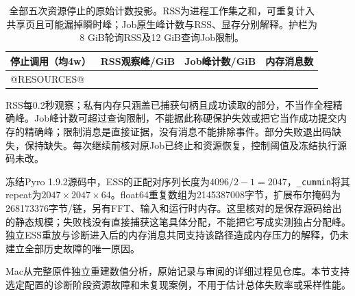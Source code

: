 \begin{table}[htbp]\centering\small
\begin{tabular}{lrrr}\toprule
停止调用（均4w） & RSS观察峰/GiB & Job峰计数/GiB & 内存消息数\\\midrule
@RESOURCES@
\bottomrule\end{tabular}
\caption{全部五次资源停止的原始计数投影。RSS为进程工作集之和，可重复计入共享页且可能漏掉瞬时峰；Job原生峰计数与RSS、显存分别解释。护栏为8 GiB轮询RSS及12 GiB查询Job限制。}
\end{table}

RSS每0.2秒观察；私有内存只涵盖已捕获句柄且成功读取的部分，不当作全程精确峰。Job峰计数可超过查询限制，不能据此称硬保护失效或把它当作成功提交内存的精确峰；限制消息是直接证据，没有消息不能排除事件。部分失败退出码缺失，保持缺失。每次继续前核对原Job已终止和资源恢复，控制阈值及冻结执行源码未改。

冻结Pyro 1.9.2源码中，ESS的正配对序列长度为$4096/2-1=2047$，\texttt{\_cummin}将其repeat为$2047\times2047\times64$。float64重复数组为2145387008字节，扩展布尔掩码为268173376字节/链，另有FFT、输入和运行时内存。这里核对的是保存源码给出的静态规模；失败栈没有直接捕获这笔具体分配，不能把它写成实测独占分配峰。独立ESS重放与诊断进入后的内存消息共同支持该路径造成内存压力的解释，仍未建立全部历史故障的唯一原因。

Mac从完整原件独立重建数值分析，原始记录与审阅的详细过程见仓库。本节支持选定配置的诊断阶段资源故障和未复现案例，不用于估计总体失败率或采样性能。
